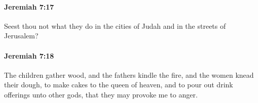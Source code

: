 		\paragraph{Jeremiah 7:17} %
			\label{JEREMIAH-7-17}

			Seest thou not what they do in the cities of Judah and in the streets of Jerusalem?


		\paragraph{Jeremiah 7:18} %
			\label{JEREMIAH-7-18}

			The children gather wood, and the fathers kindle the fire, and the women knead their dough, to make cakes to the queen of heaven, and to pour out drink offerings unto other gods, that they may provoke me to anger.


